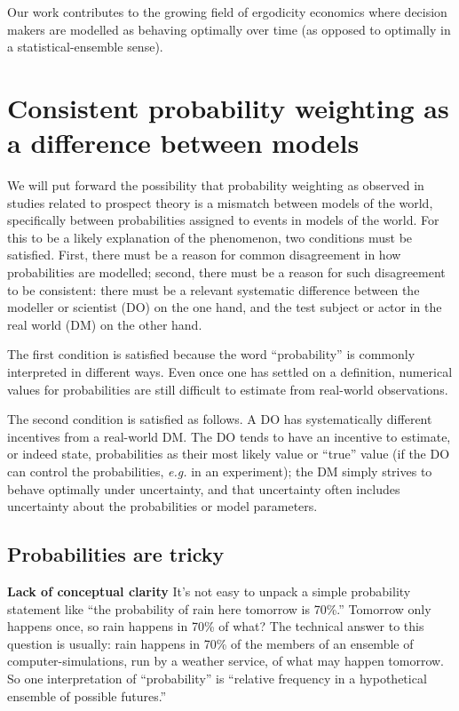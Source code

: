 \documentclass[11pt]{article}
\newcommand{\eg}{{\it e.g.}\xspace}
\newcommand{\subhead}[1]{\mbox{}\newline\textbf{#1}\newline}
\numberwithin{equation}{section}
\begin{document}
Our work contributes to the growing field of ergodicity economics
\citep{Peters2019b} where decision makers are modelled as behaving optimally over time (as opposed to optimally in a statistical-ensemble sense).

\section{Consistent probability weighting as a difference between models}
We will put forward the possibility that probability weighting as observed in studies related to prospect theory is a mismatch between models of the world, specifically between probabilities assigned to events in models of the world. For this to be a likely explanation of the phenomenon, two conditions must be satisfied. First, there must be a reason for common disagreement in how probabilities are modelled; second, there must be a reason for such disagreement to be consistent: there must be a relevant systematic difference between the modeller or scientist (DO) on the one hand, and the test subject or actor in the real world (DM) on the other hand. 

The first condition is satisfied because the word ``probability'' is commonly interpreted in different ways. Even once one has settled on a definition, numerical values for probabilities are still difficult to estimate from real-world observations.

The second condition is satisfied as follows. A DO has systematically different incentives from a real-world DM. The DO tends to have an incentive to estimate, or indeed state, probabilities as their most likely value or ``true'' value (if the DO can control the probabilities, \eg in an experiment); the DM simply strives to behave optimally under uncertainty, and that uncertainty often includes uncertainty about the probabilities or model parameters.

\subsection{Probabilities are tricky}
\subhead{Lack of conceptual clarity}
It's not easy to unpack a simple probability statement like ``the probability of rain here tomorrow is 70\%.'' Tomorrow only happens once, so rain happens in 70\% of what? The technical answer to this question is usually: rain happens in 70\% of the members of an ensemble of computer-simulations, run by a weather service, of what may happen tomorrow. So one interpretation of ``probability'' is ``relative frequency in a hypothetical ensemble of possible futures.'' 
\end{document}

